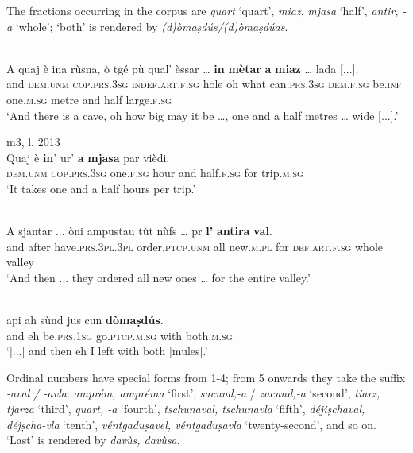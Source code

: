 The fractions occurring in the corpus are \textit{quart} `quart', \textit{miaz}, \textit{mjasa} ‘half’, \textit{antir, -a} ‘whole’; `both' is rendered by \textit{(d)òmaṣdús/(d)òmaṣdúas}.

\ea\label{}
\\
\gll A quaj è ina rùsna, ò tgé pù qual' èssar … \textbf{in} \textbf{mètar} \textbf{a} \textbf{miaz} … lada [...].\\
and \textsc{dem.unm} \textsc{cop.prs.3sg} \textsc{indef.art.f.sg} hole oh what  can.\textsc{prs.3sg} \textsc{dem.f.sg} be.\textsc{inf} {} one.\textsc{m.sg} metre and half {} large.\textsc{f.sg}\\
\glt `And there is a cave, oh how big may it be …, one and a half metres … wide [...].'
\z

\ea
\label{}
 {m3, l. 2013}\\
	\gll Quaj è \textbf{in}’ ur’ \textbf{a} \textbf{mjasa} par vièdi.  \\
\textsc{dem.unm} \textsc{cop.prs.3sg} one.\textsc{f.sg} hour and half.\textsc{f.sg} for trip.\textsc{m.sg}\\
\glt `It takes one and a half hours per trip.'
\z

\ea
\label{}
\\
\gll  A sjantar ... òni ampustau tùt nùfs … pr \textbf{l’} \textbf{antira} \textbf{val}.  \\
and after {} have.\textsc{prs.3pl.3pl} order.\textsc{ptcp.unm} all new.\textsc{m.pl} {} for \textsc{def.art.f.sg} whole valley \\
\glt `And then ... they ordered all new ones … for the entire valley.'
\z

\ea\label{}
\\
\gll  [...] api ah sùnd jus cun \textbf{dòmaṣdús}.  \\
{} and eh be.\textsc{prs.1sg} go.\textsc{ptcp.m.sg} with both.\textsc{m.sg} \\
\glt `[...] and then eh I left with both [mules].'
\z

Ordinal numbers have special forms from 1-4; from 5 onwards they take the suffix \textit{-aval /  -avla}: \textit{amprém, ampréma} `first', \textit{sacund,-a} / \textit{zacund,-a} `second', \textit{tiarz, tjarza} `third', \textit{quart, -a} `fourth', \textit{tschunaval, tschunavla}  `fifth', \textit{déjiṣchaval, déjṣcha-vla} `tenth', \textit{ véntgaduṣavel, véntgaduṣavla} `twenty-second', and so on. `Last' is rendered by \textit{davùs, davùsa}.

